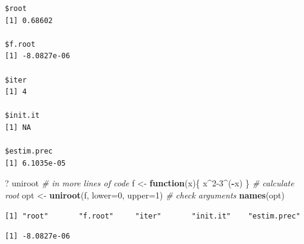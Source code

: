 \documentclass[
]{book}
\newenvironment{Shaded}{\begin{snugshade}}{\end{snugshade}}
\newcommand{\CommentTok}[1]{\textcolor[rgb]{0.56,0.35,0.01}{\textit{#1}}}
\newcommand{\ControlFlowTok}[1]{\textcolor[rgb]{0.13,0.29,0.53}{\textbf{#1}}}
\newcommand{\DataTypeTok}[1]{\textcolor[rgb]{0.13,0.29,0.53}{#1}}
\newcommand{\DecValTok}[1]{\textcolor[rgb]{0.00,0.00,0.81}{#1}}
\newcommand{\FloatTok}[1]{\textcolor[rgb]{0.00,0.00,0.81}{#1}}
\newcommand{\KeywordTok}[1]{\textcolor[rgb]{0.13,0.29,0.53}{\textbf{#1}}}
\newcommand{\NormalTok}[1]{#1}
\newcommand{\OperatorTok}[1]{\textcolor[rgb]{0.81,0.36,0.00}{\textbf{#1}}}
\newcommand{\StringTok}[1]{\textcolor[rgb]{0.31,0.60,0.02}{#1}}
\begin{document}
\begin{verbatim}
$root
[1] 0.68602

$f.root
[1] -8.0827e-06

$iter
[1] 4

$init.it
[1] NA

$estim.prec
[1] 6.1035e-05
\end{verbatim}

\begin{Shaded}
\begin{Highlighting}[]
\NormalTok{? uniroot}
\CommentTok{# in more lines of code}
\NormalTok{f <-}\StringTok{ }\ControlFlowTok{function}\NormalTok{(x)\{}
\NormalTok{	x}\OperatorTok{^}\DecValTok{2-3}\OperatorTok{^}\NormalTok{(}\OperatorTok{-}\NormalTok{x)}
\NormalTok{\}}
\CommentTok{# calculate root}
\NormalTok{opt <-}\StringTok{ }\KeywordTok{uniroot}\NormalTok{(f, }\DataTypeTok{lower=}\DecValTok{0}\NormalTok{, }\DataTypeTok{upper=}\DecValTok{1}\NormalTok{)}
\CommentTok{# check arguments}
\KeywordTok{names}\NormalTok{(opt)}
\end{Highlighting}
\end{Shaded}

\begin{verbatim}
[1] "root"       "f.root"     "iter"       "init.it"    "estim.prec"
\end{verbatim}

\begin{Shaded}
\end{Shaded}

\begin{verbatim}
[1] -8.0827e-06
\end{verbatim}

\begin{Shaded}
\end{Shaded}
\end{document}

